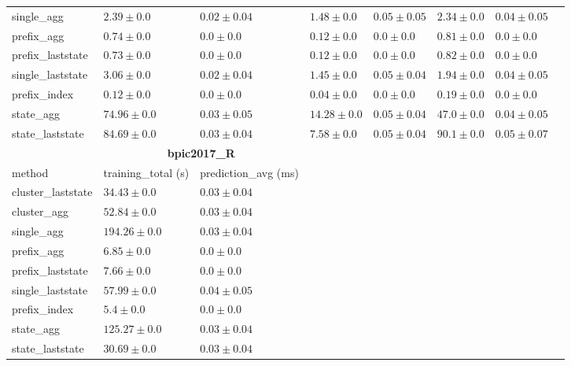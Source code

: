 \documentclass[twoside,11pt]{Latex/Classes/PhDthesisPSnPDF}
\begin{document}
\begin{table}[!htbp]
{\begin{tabular}{llllllll}
					single\_agg & $2.39 \pm 0.0$ & $0.02 \pm 0.04$ & $1.48 \pm 0.0$ & $0.05 \pm 0.05$ & $2.34 \pm 0.0$ & $0.04 \pm 0.05$ \\ 
					prefix\_agg & $0.74 \pm 0.0$ & $\mathbf{0.0 \pm 0.0}$ & $0.12 \pm 0.0$ & $\mathbf{0.0 \pm 0.0}$ & $0.81 \pm 0.0$ & $\mathbf{0.0 \pm 0.0}$ \\ 
					prefix\_laststate & $0.73 \pm 0.0$ & $\mathbf{0.0 \pm 0.0}$ & $0.12 \pm 0.0$ & $\mathbf{0.0 \pm 0.0}$ & $0.82 \pm 0.0$ & $\mathbf{0.0 \pm 0.0}$ \\ 
					single\_laststate & $3.06 \pm 0.0$ & $0.02 \pm 0.04$ & $1.45 \pm 0.0$ & $0.05 \pm 0.04$ & $1.94 \pm 0.0$ & $0.04 \pm 0.05$ \\ 
					prefix\_index & $\mathbf{0.12 \pm 0.0}$ & $\mathbf{0.0 \pm 0.0}$ & $\mathbf{0.04 \pm 0.0}$ & $\mathbf{0.0 \pm 0.0}$ & $\mathbf{0.19 \pm 0.0}$ & $\mathbf{0.0 \pm 0.0}$ \\ 
					state\_agg & $74.96 \pm 0.0$ & $0.03 \pm 0.05$ & $14.28 \pm 0.0$ & $0.05 \pm 0.04$ & $47.0 \pm 0.0$ & $0.04 \pm 0.05$ \\ 
					state\_laststate & $84.69 \pm 0.0$ & $0.03 \pm 0.04$ & $7.58 \pm 0.0$ & $0.05 \pm 0.04$ & $90.1 \pm 0.0$ & $0.05 \pm 0.07$ \\ 
					\bottomrule
					\toprule
					& \multicolumn{2}{c}{{\bfseries bpic2017\_R}} \\ \cmidrule(lr){2-3} \cmidrule(lr){4-5} \cmidrule(lr){6-7}
					method  & training\_total (s) & prediction\_avg (ms) \\ \midrule
					cluster\_laststate & $34.43 \pm 0.0$ & $0.03 \pm 0.04$ \\ 
					cluster\_agg & $52.84 \pm 0.0$ & $0.03 \pm 0.04$ \\ 
					single\_agg & $194.26 \pm 0.0$ & $0.03 \pm 0.04$ \\ 
					prefix\_agg & $6.85 \pm 0.0$ & $\mathbf{0.0 \pm 0.0}$ \\ 
					prefix\_laststate & $7.66 \pm 0.0$ & $\mathbf{0.0 \pm 0.0}$ \\ 
					single\_laststate & $57.99 \pm 0.0$ & $0.04 \pm 0.05$ \\ 
					prefix\_index & $\mathbf{5.4 \pm 0.0}$ & $\mathbf{0.0 \pm 0.0}$ \\ 
					state\_agg & $125.27 \pm 0.0$ & $0.03 \pm 0.04$ \\ 
					state\_laststate & $30.69 \pm 0.0$ & $0.03 \pm 0.04$ \\ 
					\bottomrule
					
			
		\end{tabular}%
	}
	
	
\end{table}
\end{document}
